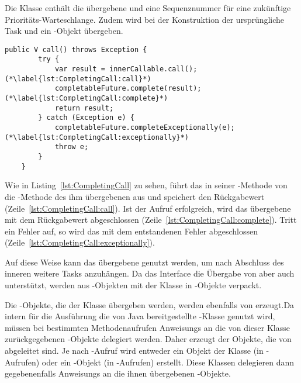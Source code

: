 Die Klasse  enthält die übergebene  und eine Sequenznummer für eine zukünftige Prioritäts-Warteschlange. Zudem wird bei der Konstruktion der ursprüngliche Task und ein -Objekt übergeben. 
\begin{lstlisting}[caption={\code{call()}-Methode von \class{CompletingCallable}. Das enthaltene \class{Callable} wird ausgeführt und dann das \class{CompletableFuture} abgeschlossen.}, label={lst:CompletingCall},float={thbp}]
	public V call() throws Exception {
		try {
			var result = innerCallable.call(); (*\label{lst:CompletingCall:call}*)
			completableFuture.complete(result); (*\label{lst:CompletingCall:complete}*)
			return result;
		} catch (Exception e) {
			completableFuture.completeExceptionally(e); (*\label{lst:CompletingCall:exceptionally}*)
			throw e;
		}
	}
\end{lstlisting}
Wie in Listing~\ref{lst:CompletingCall} zu sehen, führt das  in seiner -Methode von die -Methode des ihm übergebenen   aus und speichert den Rückgabewert (Zeile~\ref{lst:CompletingCall:call}). Ist der Aufruf erfolgreich, wird das übergebene  mit dem Rückgabewert abgeschlossen (Zeile~\ref{lst:CompletingCall:complete}). Tritt ein Fehler auf, so wird das   mit dem entstandenen Fehler abgeschlossen (Zeile~\ref{lst:CompletingCall:exceptionally}).

Auf diese Weise kann das übergebene  genutzt werden, um nach Abschluss des inneren  weitere Tasks anzuhängen.
Da das Interface  die Übergabe von  aber auch  unterstützt, werden aus -Objekten mit der Klasse  in -Objekte verpackt.

Die -Objekte, die der Klasse  übergeben werden, werden ebenfalls von  erzeugt.Da intern für die Ausführung die von Java bereitgestellte -Klasse genutzt wird, müssen bei bestimmten Methodenaufrufen \glspl{Anweisung} an die von dieser Klasse zurückgegebenen -Objekte delegiert werden. Daher erzeugt der 
 Objekte, die von  abgeleitet sind. Je nach -Aufruf wird entweder ein Objekt der Klasse  (in -Aufrufen) oder ein -Objekt (in -Aufrufen) erstellt. Diese Klassen delegieren dann gegebenenfalls \glspl{Anweisung} an die ihnen übergebenen -Objekte.

